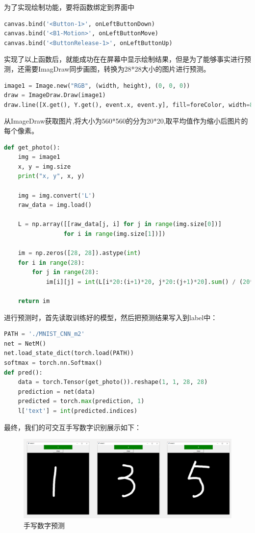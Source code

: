 \documentclass[withoutpreface,bwprint]{cumcmthesis} %
\begin{document}
为了实现绘制功能，要将函数绑定到界面中
\begin{lstlisting}[language=python]
canvas.bind('<Button-1>', onLeftButtonDown)
canvas.bind('<B1-Motion>', onLeftButtonMove)
canvas.bind('<ButtonRelease-1>', onLeftButtonUp)
\end{lstlisting}
实现了以上函数后，就能成功在在屏幕中显示绘制结果，但是为了能够事实进行预测，还需要ImagDraw同步画图，转换为28*28大小的图片进行预测。
\begin{lstlisting}[language=python]
image1 = Image.new("RGB", (width, height), (0, 0, 0))
draw = ImageDraw.Draw(image1)
draw.line([X.get(), Y.get(), event.x, event.y], fill=foreColor, width=8)
\end{lstlisting}
从ImageDraw获取图片,将大小为560*560的分为20*20,取平均值作为缩小后图片的每个像素。
\begin{lstlisting}[language=python]
def get_photo():
    img = image1
    x, y = img.size
    print("x, y", x, y)

    img = img.convert('L')
    raw_data = img.load()

    L = np.array([[raw_data[j, i] for j in range(img.size[0])]
                 for i in range(img.size[1])])

    im = np.zeros([28, 28]).astype(int)
    for i in range(28):
        for j in range(28):
            im[i][j] = int(L[i*20:(i+1)*20, j*20:(j+1)*20].sum() / (20**2))

    return im
\end{lstlisting}
进行预测时，首先读取训练好的模型，然后把预测结果写入到label中：
\begin{lstlisting}[language=python]
PATH = './MNIST_CNN_m2'
net = NetM()
net.load_state_dict(torch.load(PATH))
softmax = torch.nn.Softmax()
def pred():
    data = torch.Tensor(get_photo()).reshape(1, 1, 28, 28)
    prediction = net(data)
    predicted = torch.max(prediction, 1)
    l['text'] = int(predicted.indices)
\end{lstlisting}
最终，我们的可交互手写数字识别展示如下：
\begin{figure}[H]
		\centering
		\includegraphics[width=1\textwidth]{pred}
		\caption{手写数字预测}
	\end{figure}
\end{document}
